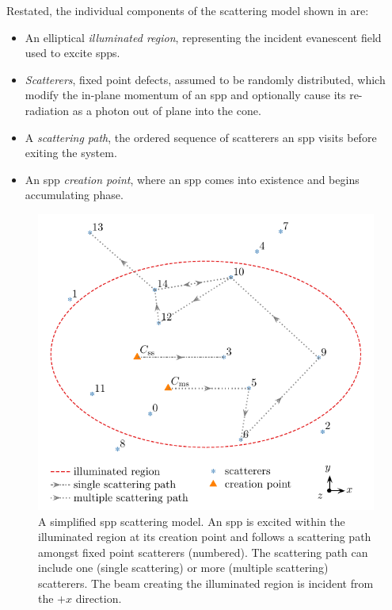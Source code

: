 Restated, the individual components of the scattering model shown in
 are:
\begin{itemize}
\item An elliptical \textit{illuminated region}, representing the incident
				evanescent field used to excite \glspl{spp}.
\item \textit{Scatterers}, fixed point defects, assumed to be randomly
				distributed, which modify the in-plane momentum of an \gls{spp} and
				optionally cause its re-radiation as a photon out of plane into the cone.
\item A \textit{scattering path}, the ordered sequence of
				scatterers an \gls{spp} visits before exiting the system.
\item An \gls{spp} \textit{creation point}, where an \gls{spp} comes into existence and
				begins accumulating phase.
\end{itemize}
\begin{figure}[ht]
\centering
\includegraphics[keepaspectratio]{scatteringmicro/figures/montecarlogeosimple.pdf}
\caption{A simplified \gls{spp} scattering model.  An \gls{spp} is excited within the
	illuminated region at its creation point and follows a scattering path
	amongst fixed point scatterers (numbered).  The scattering path can
	include one (single scattering) or more (multiple scattering)
	scatterers.  The beam creating the illuminated region is incident from
	the ${+}x$ direction.}
\label{fig:plasmongeosimple}
\end{figure}

